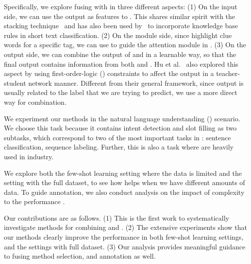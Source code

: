 

Specifically, we explore fusing \RE with \NN in three different aspects: (1) On the \NN input side, we can use the \RE output as features
to \NN. This shares similar spirit with the stacking technique~\cite{wolpert1992stacked} and has also been used by~\cite{wang2017combining}
to incorporate knowledge base rules in short text classification.
(2) On the \NN module side, since \REs highlight clue words for a
specific tag, we can use \RE to guide the attention module in \NN. (3) On the \NN output side, we can combine the output of \RE and \NN in
a learnable way, so that the final output contains information from both \NN and \RE. Hu et al.~ also explored
this aspect by using first-order-logic (\FOL) constraints to affect the \NN output in a teacher-student network manner. Different from
their general framework, since \RE output is usually related to the label that we are trying to predict, we use a more direct way for
combination.

We experiment our methods in the natural language understanding (\NLU) scenario. We choose this task because it contains intent detection
and slot filling as two subtasks, which correspond to two of the most important tasks in \NLP: sentence classification, sequence labeling.
Further, this is also a task where \REs are heavily used in industry.

We explore both the few-shot learning setting where the data is limited and the setting with the full dataset, to see how \RE helps when we have different amounts of data.
To guide \RE annotation, we also conduct analysis on the impact of \RE complexity to the performance \NN.

Our contributions are as follows. (1) This is the first work to systematically investigate methods for combining \RE and \NN. (2) The
extensive experiments show that our methods clearly improve the \NN performance in both few-shot learning settings, and the settings with
full dataset. (3) Our analysis provides meaningful guidance to fusing method selection, and \RE annotation as well.
